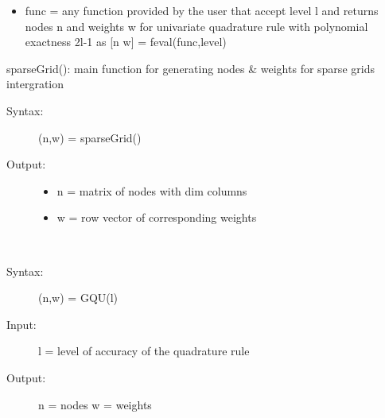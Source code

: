 \documentclass[letterpaper,10pt,english]{sphinxmanual}
\begin{document}
\begin{fulllineitems}
\begin{description}
\begin{itemize}
\item {} 
func =  any function provided by the user that accept level l and returns nodes n and weights w for univariate quadrature rule with polynomial exactness 2l-1 as {[}n w{]} = feval(func,level)

\end{itemize}

\end{description}

\begin{fulllineitems}
\label{index:SpectralToolbox.SparseGrids.SparseGrid.sparseGrid}
sparseGrid(): main function for generating nodes \& weights for sparse grids intergration
\begin{description}
\item[{Syntax: }] \leavevmode
(n,w) = sparseGrid()

\item[{Output:}] \leavevmode\begin{itemize}
\item {} 
n    = matrix of nodes with dim columns

\item {} 
w    = row vector of corresponding weights

\end{itemize}

\end{description}

\end{fulllineitems}


\end{fulllineitems}


\begin{fulllineitems}
\label{index:SpectralToolbox.SparseGrids.GQU}~\begin{description}
\item[{Syntax:}] \leavevmode
(n,w) = GQU(l)

\item[{Input:}] \leavevmode
l = level of accuracy of the quadrature rule

\item[{Output:}] \leavevmode
n = nodes
w = weights

\end{description}

\end{fulllineitems}
\end{document}
